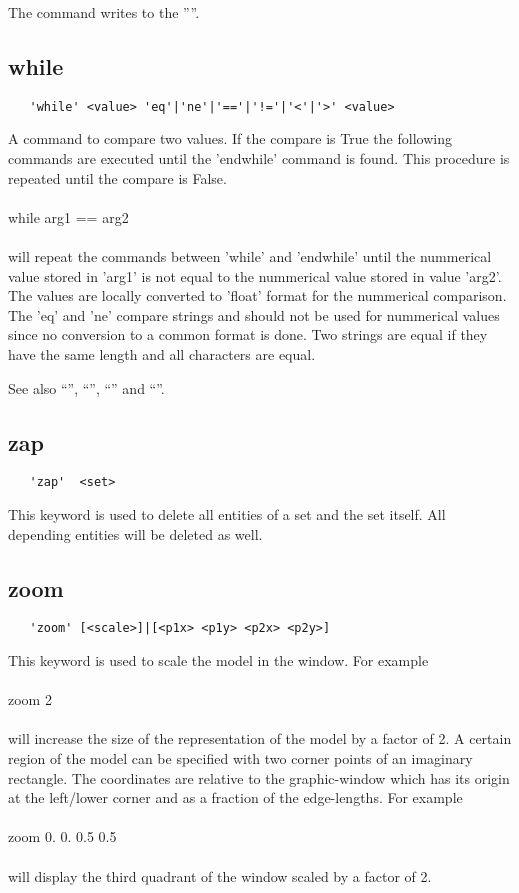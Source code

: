 \documentclass{article}
\begin{document}
The command writes to the ''''.

\subsection{\label{while}while}
\begin{verbatim}
   'while' <value> 'eq'|'ne'|'=='|'!='|'<'|'>' <value>
\end{verbatim}
A command to compare two values. If the compare is True the following commands are executed until the 'endwhile' command is found. This procedure is repeated until the compare is False.
\\\\while arg1 == arg2\\\\will repeat the commands between 'while' and 'endwhile' until the nummerical value stored in 'arg1' is not equal to the nummerical value stored in value 'arg2'. The values are locally converted to 'float' format for the nummerical comparison. The 'eq' and 'ne' compare strings and should not be used for nummerical values since no conversion to a common format is done. Two strings are equal if they have the same length and all characters are equal.

See also ``'', ``'', ``'' and ``''.

\subsection{\label{zap}zap}
\begin{verbatim}
   'zap'  <set> 
\end{verbatim}
This keyword is used to delete all entities of a set and the set itself. All depending entities will be deleted as well.

\subsection{\label{zoom}zoom}
\begin{verbatim}
   'zoom' [<scale>]|[<p1x> <p1y> <p2x> <p2y>]
\end{verbatim}
This keyword is used to scale the model in the window. For example\\\\zoom 2\\\\will increase the size of the representation of the model by a factor of 2. A certain region of the model can be specified with two corner points of an imaginary rectangle. The coordinates are relative to the graphic-window which has its origin at the left/lower corner and as a fraction of the edge-lengths. For example \\\\zoom 0. 0. 0.5 0.5\\\\will display the third quadrant of the window scaled by a factor of 2.  
\end{document}

